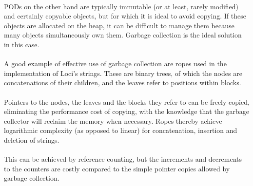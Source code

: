 \documentclass[12pt,twoside,notitlepage]{report}
\begin{document}
\paragraph{}
PODs on the other hand are typically immutable (or at least, rarely modified) and certainly copyable objects, but for which it is ideal to avoid copying. If these objects are allocated on the heap, it can be difficult to manage them because many objects simultaneously own them. Garbage collection is the ideal solution in this case.

\paragraph{}
A good example of effective use of garbage collection are ropes used in the implementation of Loci's strings. These are binary trees, of which the nodes are concatenations of their children, and the leaves refer to positions within blocks.

\paragraph{}
Pointers to the nodes, the leaves and the blocks they refer to can be freely copied, eliminating the performance cost of copying, with the knowledge that the garbage collector will reclaim the memory when necessary. Ropes thereby achieve logarithmic complexity (as opposed to linear) for concatenation, insertion and deletion of strings.

\paragraph{}
This can be achieved by reference counting, but the increments and decrements to the counters are costly compared to the simple pointer copies allowed by garbage collection.
\end{document}
